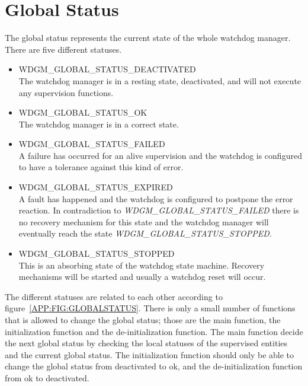 \section{Global Status}
\label{APP:GLOBALSTATUS}
The global status represents the current state of the whole watchdog
manager. There are five different statuses.
\begin{itemize}
\item WDGM\_GLOBAL\_STATUS\_DEACTIVATED \\
  The watchdog manager is in a resting state, deactivated, and will not execute
  any supervision functions.
\item WDGM\_GLOBAL\_STATUS\_OK \\
  The watchdog manager is in a correct state.
\item WDGM\_GLOBAL\_STATUS\_FAILED \\
  A failure has occurred for an alive supervision and the watchdog is configured
  to have a tolerance against this kind of error.
\item WDGM\_GLOBAL\_STATUS\_EXPIRED \\
  A fault has happened and the watchdog is configured to postpone the error
  reaction. In contradiction to
  \emph{WDGM\_GLOBAL\_STATUS\_FAILED} there is no recovery mechanism for this
  state and the watchdog manager will eventually reach the state
  \emph{WDGM\_GLOBAL\_STATUS\_STOPPED}.
\item WDGM\_GLOBAL\_STATUS\_STOPPED \\
  This is an absorbing state of the watchdog state machine. Recovery mechanisms
  will be started and usually a watchdog reset will occur.
\end{itemize}
The different statuses are related to each other according to figure~\ref{APP:FIG:GLOBALSTATUS}.
There is only a small number of functions that is allowed to change the global
status; those are the main function, the initialization function and the
de-initialization function. The main function decide the next global status by
checking the local statuses of the supervised entities and the current global
status. The initialization function should only be able to change the global
status from deactivated to ok, and the de-initialization function from ok to deactivated.

